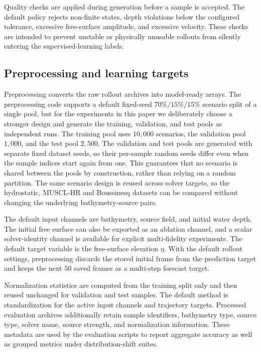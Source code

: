 Quality checks are applied during generation before a sample is accepted. The default policy rejects non-finite states, depth violations below the configured tolerance, excessive free-surface amplitude, and excessive velocity. These checks are intended to prevent unstable or physically unusable rollouts from silently entering the supervised-learning labels.

\subsection{Preprocessing and learning targets}
\label{subsec:preprocessing-targets}

Preprocessing converts the raw rollout archives into model-ready arrays. The preprocessing code supports a default fixed-seed $70\%/15\%/15\%$ scenario split of a single pool, but for the experiments in this paper we deliberately choose a stronger design and generate the training, validation, and test pools as independent runs. The training pool uses $10{,}000$ scenarios, the validation pool $1{,}000$, and the test pool $2{,}500$. The validation and test pools are generated with separate fixed dataset seeds, so their per-sample random seeds differ even when the sample indices start again from one. This guarantees that no scenario is shared between the pools by construction, rather than relying on a random partition. The same scenario design is reused across solver targets, so the hydrostatic, MUSCL-HR and Boussinesq datasets can be compared without changing the underlying bathymetry-source pairs.

The default input channels are bathymetry, source field, and initial water depth. The initial free surface can also be exported as an ablation channel, and a scalar solver-identity channel is available for explicit multi-fidelity experiments. The default target variable is the free-surface elevation $\eta$. With the default rollout settings, preprocessing discards the stored initial frame from the prediction target and keeps the next $50$ saved frames as a multi-step forecast target.

Normalization statistics are computed from the training split only and then reused unchanged for validation and test samples. The default method is standardization for the active input channels and trajectory targets. Processed evaluation archives additionally retain sample identifiers, bathymetry type, source type, solver name, source strength, and normalization information. These metadata are used by the evaluation scripts to report aggregate accuracy as well as grouped metrics under distribution-shift suites.

